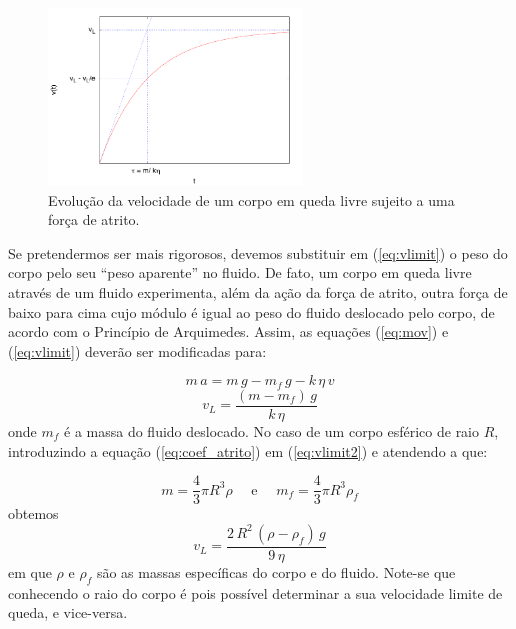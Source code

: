 \documentclass[a4paper,twoside,11pt]{report}      %
\begin{document}

\begin{figure}[tb]
  \centering 
	\includegraphics[width=0.6\textwidth]{./plote}
	\caption{ Evolução da velocidade de um corpo em queda livre sujeito a uma força de atrito. \label{fig:vLim}} 
\end{figure}


Se pretendermos ser mais rigorosos, devemos substituir  em (\ref{eq:vlimit}) o peso do corpo pelo seu “peso aparente” no fluido. De fato, um corpo em queda livre através de um fluido experimenta, além da ação da força de atrito, outra força de baixo para cima cujo módulo é igual ao peso do fluido deslocado pelo corpo, de acordo com o Princípio de Arquimedes. Assim, as equações (\ref{eq:mov}) e (\ref{eq:vlimit}) deverão ser modificadas para:

\begin{equation}
	\label{eq:mov2}
	m\,a = m\,g - m_f\,g  - k  \, \eta \, v
\end{equation}
\begin{equation}
	\label{eq:vlimit2}
	v_L = \frac{(m - m_f)\,g}{k  \, \eta}
\end{equation}
onde $m_f$ é a massa do fluido deslocado. No caso de um corpo esférico de raio $R$, introduzindo a equação (\ref{eq:coef_atrito}) em (\ref{eq:vlimit2}) e atendendo a que:

\begin{equation*}
	m = \frac{4}{3} \pi R^3 \rho \quad \textrm{  e } \quad  m_f = \frac{4}{3} \pi R^3 \rho_f
\end{equation*}
obtemos
\begin{equation}
	\label{eq:vlimit3}
	v_L = \frac{2\,R^2\, (\rho - \rho_f)\,g}{9  \, \eta}
\end{equation}
em que $\rho$  e $\rho_f$ são as massas específicas do corpo e do fluido. Note-se que conhecendo o raio do corpo é pois possível determinar  a sua velocidade limite de queda, e vice-versa.
\end{document}

